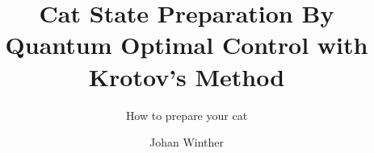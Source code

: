 \documentclass[masters,university,a4paper]{chalmers-thesis}
\title{Cat State Preparation By Quantum Optimal Control with Krotov's Method}
\subtitle{How to prepare your cat} %
\author{Johan Winther}
\begin{document}
\maketitle

%







\printbibliography{} %
\end{document}
